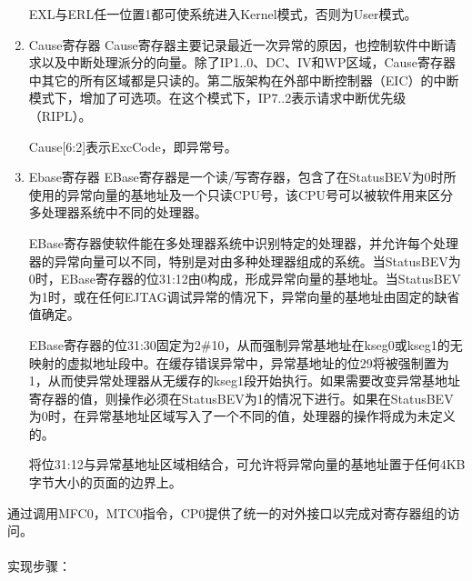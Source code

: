 \begin{enumerate}[(1)]
EXL与ERL任一位置1都可使系统进入Kernel模式，否则为User模式。

\item Cause寄存器
Cause寄存器主要记录最近一次异常的原因，也控制软件中断请求以及中断处理派分的向量。除了IP1..0、DC、IV和WP区域，Cause寄存器中其它的所有区域都是只读的。第二版架构在外部中断控制器（EIC）的中断模式下，增加了可选项。在这个模式下，IP7..2表示请求中断优先级（RIPL）。

Cause[6:2]表示ExcCode，即异常号。

\item Ebase寄存器
EBase寄存器是一个读/写寄存器，包含了在StatusBEV为0时所使用的异常向量的基地址及一个只读CPU号，该CPU号可以被软件用来区分多处理器系统中不同的处理器。

EBase寄存器使软件能在多处理器系统中识别特定的处理器，并允许每个处理器的异常向量可以不同，特别是对由多种处理器组成的系统。当StatusBEV为0时，EBase寄存器的位31:12由0构成，形成异常向量的基地址。当StatusBEV为1时，或在任何EJTAG调试异常的情况下，异常向量的基地址由固定的缺省值确定。

EBase寄存器的位31:30固定为2\#10，从而强制异常基地址在kseg0或kseg1的无映射的虚拟地址段中。在缓存错误异常中，异常基地址的位29将被强制置为1，从而使异常处理器从无缓存的kseg1段开始执行。如果需要改变异常基地址寄存器的值，则操作必须在StatusBEV为1的情况下进行。如果在StatusBEV为0时，在异常基地址区域写入了一个不同的值，处理器的操作将成为未定义的。

将位31:12与异常基地址区域相结合，可允许将异常向量的基地址置于任何4KB字节大小的页面的边界上。

\end{enumerate}

通过调用MFC0，MTC0指令，CP0提供了统一的对外接口以完成对寄存器组的访问。\\\\
实现步骤：

